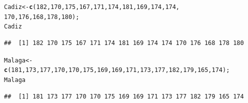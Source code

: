\documentclass[12pt,letterpaper]{article}\usepackage[]{graphicx}\usepackage[]{color}
\makeatletter
\newcommand{\hlnum}[1]{\textcolor[rgb]{0.686,0.059,0.569}{#1}}%
\newcommand{\hlstd}[1]{\textcolor[rgb]{0.345,0.345,0.345}{#1}}%
\newcommand{\hlkwb}[1]{\textcolor[rgb]{0.69,0.353,0.396}{#1}}%
\newcommand{\hlkwd}[1]{\textcolor[rgb]{0.737,0.353,0.396}{\textbf{#1}}}%
\newenvironment{kframe}{%
 \def\at@end@of@kframe{}%
 \ifinner\ifhmode%
  \def\at@end@of@kframe{\end{minipage}}%
  \begin{minipage}{\columnwidth}%
 \fi\fi%
 \def\FrameCommand##1{\hskip\@totalleftmargin \hskip-\fboxsep
 \colorbox{shadecolor}{##1}\hskip-\fboxsep
     \hskip-\linewidth \hskip-\@totalleftmargin \hskip\columnwidth}%
 \MakeFramed {\advance\hsize-\width
   \@totalleftmargin\z@ \linewidth\hsize
   \@setminipage}}%
 {\par\unskip\endMakeFramed%
 \at@end@of@kframe}
\newenvironment{knitrout}{}{} %
\makeatother
\begin{document}
\begin{knitrout}
\color{fgcolor}\begin{kframe}
\begin{alltt}
\hlstd{Cadiz} \hlkwb{<-} \hlkwd{c} \hlstd{(}\hlnum{182}\hlstd{,} \hlnum{170}\hlstd{,} \hlnum{175}\hlstd{,} \hlnum{167}\hlstd{,} \hlnum{171}\hlstd{,}  \hlnum{174}\hlstd{,}  \hlnum{181}\hlstd{,}  \hlnum{169}\hlstd{,}  \hlnum{174}\hlstd{,}  \hlnum{174}\hlstd{,}
            \hlnum{170}\hlstd{,}  \hlnum{176}\hlstd{,} \hlnum{168}\hlstd{,} \hlnum{178}\hlstd{,}  \hlnum{180}\hlstd{);}
\hlstd{Cadiz}
\end{alltt}
\begin{verbatim}
##  [1] 182 170 175 167 171 174 181 169 174 174 170 176 168 178 180
\end{verbatim}
\begin{alltt}
\hlstd{Malaga} \hlkwb{<-} \hlkwd{c} \hlstd{(}\hlnum{181}\hlstd{,} \hlnum{173}\hlstd{,} \hlnum{177}\hlstd{,} \hlnum{170}\hlstd{,} \hlnum{170}\hlstd{,}  \hlnum{175}\hlstd{,}  \hlnum{169}\hlstd{,}  \hlnum{169}\hlstd{,}  \hlnum{171}\hlstd{,}  \hlnum{173}\hlstd{,}  \hlnum{177}\hlstd{,}  \hlnum{182}\hlstd{,} \hlnum{179}\hlstd{,} \hlnum{165}\hlstd{,}  \hlnum{174}\hlstd{);}
\hlstd{Malaga}
\end{alltt}
\begin{verbatim}
##  [1] 181 173 177 170 170 175 169 169 171 173 177 182 179 165 174
\end{verbatim}
\end{kframe}
\end{knitrout}
\end{document}
